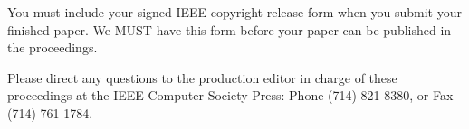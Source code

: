 \documentclass[times, 10pt,twocolumn]{article}
\begin{document}

You must include your signed IEEE copyright release form when you submit
your finished paper. We MUST have this form before your paper can be
published in the proceedings.


Please direct any questions to the production editor in charge of these
proceedings at the IEEE Computer Society Press: Phone (714) 821-8380, or
Fax (714) 761-1784.

\nocite{ex1,ex2}  
\end{document}
